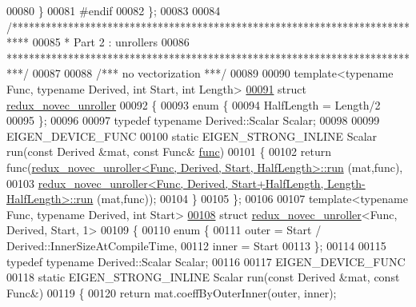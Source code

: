 \begin{DoxyCode}
00080   \}
00081 \textcolor{preprocessor}{#endif}
00082 \};
00083 
00084 \textcolor{comment}{/***************************************************************************}
00085 \textcolor{comment}{* Part 2 : unrollers}
00086 \textcolor{comment}{***************************************************************************/}
00087 
00088 \textcolor{comment}{/*** no vectorization ***/}
00089 
00090 \textcolor{keyword}{template}<\textcolor{keyword}{typename} Func, \textcolor{keyword}{typename} Derived, \textcolor{keywordtype}{int} Start, \textcolor{keywordtype}{int} Length>
\hyperlink{struct_eigen_1_1internal_1_1redux__novec__unroller}{00091} \textcolor{keyword}{struct }\hyperlink{struct_eigen_1_1internal_1_1redux__novec__unroller}{redux\_novec\_unroller}
00092 \{
00093   \textcolor{keyword}{enum} \{
00094     HalfLength = Length/2
00095   \};
00096 
00097   \textcolor{keyword}{typedef} \textcolor{keyword}{typename} Derived::Scalar Scalar;
00098 
00099   EIGEN\_DEVICE\_FUNC
00100   \textcolor{keyword}{static} EIGEN\_STRONG\_INLINE Scalar run(\textcolor{keyword}{const} Derived &mat, \textcolor{keyword}{const} Func& \hyperlink{structfunc}{func})
00101   \{
00102     \textcolor{keywordflow}{return} func(\hyperlink{struct_eigen_1_1internal_1_1redux__novec__unroller}{redux\_novec\_unroller<Func, Derived, Start, HalfLength>::run}
      (mat,func),
00103                 
      \hyperlink{struct_eigen_1_1internal_1_1redux__novec__unroller}{redux\_novec\_unroller<Func, Derived, Start+HalfLength, Length-HalfLength>::run}
      (mat,func));
00104   \}
00105 \};
00106 
00107 \textcolor{keyword}{template}<\textcolor{keyword}{typename} Func, \textcolor{keyword}{typename} Derived, \textcolor{keywordtype}{int} Start>
\hyperlink{struct_eigen_1_1internal_1_1redux__novec__unroller_3_01_func_00_01_derived_00_01_start_00_011_01_4}{00108} \textcolor{keyword}{struct }\hyperlink{struct_eigen_1_1internal_1_1redux__novec__unroller}{redux\_novec\_unroller}<Func, Derived, Start, 1>
00109 \{
00110   \textcolor{keyword}{enum} \{
00111     outer = Start / Derived::InnerSizeAtCompileTime,
00112     inner = Start %
00113   \};
00114 
00115   \textcolor{keyword}{typedef} \textcolor{keyword}{typename} Derived::Scalar Scalar;
00116 
00117   EIGEN\_DEVICE\_FUNC
00118   \textcolor{keyword}{static} EIGEN\_STRONG\_INLINE Scalar run(\textcolor{keyword}{const} Derived &mat, \textcolor{keyword}{const} Func&)
00119   \{
00120     \textcolor{keywordflow}{return} mat.coeffByOuterInner(outer, inner);

\end{DoxyCode}
